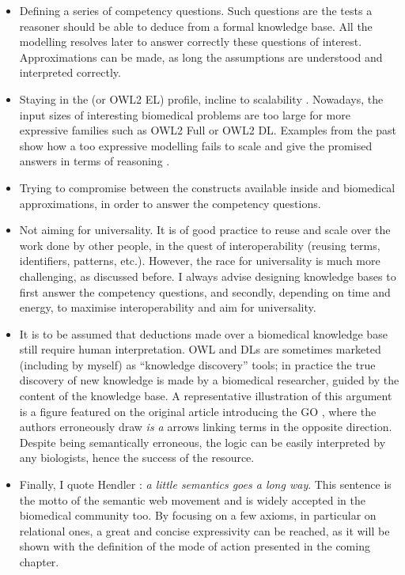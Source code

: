 \begin{itemize}
  \item Defining a series of competency questions. Such questions are the tests a reasoner should be able to deduce from a formal knowledge base. All the modelling resolves later to answer correctly these questions of interest. Approximations can be made, as long the assumptions are understood and interpreted correctly.
  \item Staying in the  (or OWL2 EL) profile, incline to scalability \citep{hoehndorf2011common}. Nowadays, the input sizes of interesting biomedical problems are too large for more expressive families such as OWL2 Full or OWL2 DL. Examples from the past show how a too expressive modelling fails to scale and give the promised answers in terms of reasoning \citep{vempati2012formalization} \citep{golbreich2006foundational} \citep{mungall2010integrating} \citep{mungall2011cross} \citep{villanueva2008yowl}.
  \item Trying to compromise between the constructs available inside  and biomedical approximations, in order to answer the competency questions.
  \item Not aiming for universality. It is of good practice to reuse and scale over the work done by other people, in the quest of interoperability (reusing terms, identifiers, patterns, etc.). However, the race for universality is much more challenging, as discussed before. I always advise designing knowledge bases to first answer the competency questions, and secondly, depending on time and energy, to maximise interoperability and aim for universality.
  \item It is to be assumed that deductions made over a biomedical knowledge base still require human interpretation. OWL and DLs are sometimes marketed (including by myself) as ``knowledge discovery'' tools; in practice the true discovery of new knowledge is made by a biomedical researcher, guided by the content of the knowledge base. A representative illustration of this argument is a figure featured on the original article introducing the GO \citep{ashburner2000gene}, where the authors erroneously draw \emph{is a} arrows linking terms in the opposite direction. Despite being semantically erroneous, the logic can be easily interpreted by any biologists, hence the success of the resource.
  \item Finally, I quote Hendler \citep{littlesemantics}: \emph{a little semantics goes a long way}. This sentence is the motto of the semantic web movement and is widely accepted in the biomedical community too. By focusing on a few axioms, in particular on relational ones, a great and concise expressivity can be reached, as it will be shown with the definition of the mode of action presented in the coming chapter.
\end{itemize}

